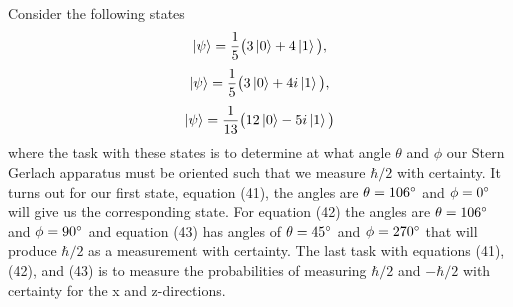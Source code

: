 \documentclass[twocolumn]{article}
\begin{document}
Consider the following states
\begin{equation}
\ket{\psi}=\frac{1}{5}\big(3\ket{0} + 4\ket{1}\big),
\end{equation}
\begin{equation}
\ket{\psi}=\frac{1}{5}\big(3\ket{0} + 4i\ket{1}\big),
\end{equation}
\begin{equation}
\ket{\psi}=\frac{1}{13}\big(12\ket{0} - 5i\ket{1}\big)
\end{equation}
where the task with these states is to determine at what angle $\theta$ and $\phi$ our Stern Gerlach apparatus must be oriented such that we measure $\hbar/2$ with certainty. It turns out for our first state, equation (41), the angles are $\theta=106\degree$ and $\phi=0\degree$ will give us the corresponding state. For equation (42) the angles are $\theta=106\degree$ and $\phi=90\degree$ and equation (43) has angles of $\theta=45\degree$ and $\phi=270\degree$ that will produce $\hbar/2$ as a measurement with certainty. The last task with equations (41), (42), and (43) is to measure the probabilities of measuring $\hbar/2$ and $-\hbar/2$ with certainty for the x and z-directions.
\end{document}
